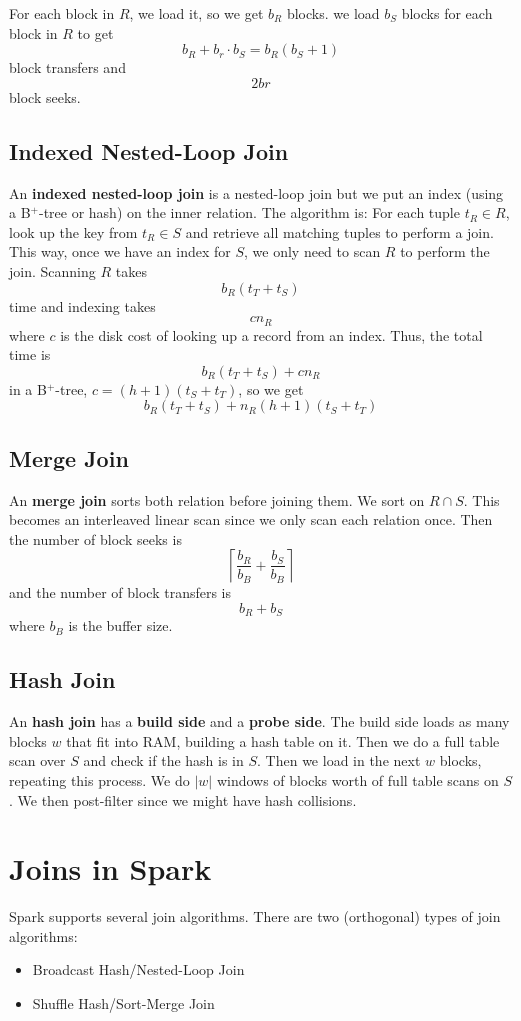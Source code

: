 \documentclass{report}
\renewcommand{\bf}[1]{\textbf{{#1}}}
\begin{document}
For each block in $R$, we load it, so we get $b_R$ blocks. we load $b_S$ blocks
for each block in $R$ to get
\[b_R + b_r \cdot b_S = b_R(b_S + 1)\]
block transfers and
\[2br\]
block seeks.

\subsection{Indexed Nested-Loop Join}
An \bf{indexed nested-loop join} is a nested-loop join but we put an index
(using a B$^+$-tree or hash) on the inner relation. The algorithm is:
For each tuple $t_R \in R$, look up the key from $t_R \in S$ and retrieve all
matching tuples to perform a join. This way, once we have an index for $S$, we
only need to scan $R$ to perform the join. Scanning $R$ takes
\[b_R(t_T + t_S)\]
time and indexing takes
\[cn_R\]
where $c$ is the disk cost of looking up a record from an index. Thus, the total time is
\[b_R(t_T + t_S) + cn_R\]
in a B$^+$-tree, $c = (h + 1)(t_S + t_T)$, so we get
\[b_R(t_T + t_S) + n_R(h + 1)(t_S + t_T)\]

\subsection{Merge Join}
An \bf{merge join} sorts both relation before joining them. We sort on
$R \cap S$. This becomes an interleaved linear scan since we only scan each
relation once. Then the number of block seeks is
\[\left\lceil\frac{b_R}{b_B} + \frac{b_S}{b_B}\right\rceil\]
and the number of block transfers is
\[b_R + b_S\]
where $b_B$ is the buffer size.

\subsection{Hash Join}
An \bf{hash join} has a \bf{build side} and a \bf{probe side}. The build side
loads as many blocks $w$ that fit into RAM, building a hash table on it. Then we
do a full table scan over $S$ and check if the hash is in $S$. Then we load in
the next $w$ blocks, repeating this process. We do $|w|$ windows of blocks worth
of full table scans on $S$. We then post-filter since we might have hash
collisions.

\section{Joins in Spark}
Spark supports several join algorithms. There are two (orthogonal) types of
join algorithms:
\begin{itemize}[label=$\to$]
    \item Broadcast Hash/Nested-Loop Join
    \item Shuffle Hash/Sort-Merge Join
\end{itemize}
\end{document}
